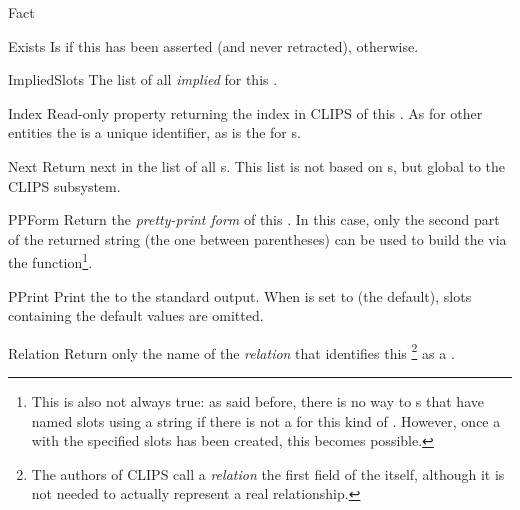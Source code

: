 \begin{classdesc*}{Fact}
\begin{memberdesc}{Exists}{}
Is  if this  has been asserted (and never
retracted),  otherwise.
\end{memberdesc}

\begin{memberdesc}[property]{ImpliedSlots}
The list of all \emph{implied}  for this .
\end{memberdesc}

\begin{memberdesc}[property]{Index}
Read-only property returning the index in CLIPS of this . As
for other entities the  is a unique identifier, as is the
 for s.
\end{memberdesc}

\begin{methoddesc}{Next}{}
Return next  in the list of all s. This list is
not based on s, but global to the CLIPS subsystem.
\end{methoddesc}

\begin{methoddesc}{PPForm}{}
Return the \emph{pretty-print form} of this . In this case,
only the second part of the returned string (the one between parentheses)
can be used to build the  via the 
function\footnote{This is also not always true: as said before, there is
no way to  s that have named slots using a
string if there is not a  for this kind of
. However, once a  with the specified slots
has been created, this becomes possible.}.
\end{methoddesc}

\begin{methoddesc}{PPrint}{}
Print the  to the standard output. When 
is set to  (the default), slots containing the default
values are omitted.
\end{methoddesc}

\begin{memberdesc}[property]{Relation}
Return only the name of the \emph{relation} that identifies this
\footnote{The authors of CLIPS call a \emph{relation} the first
field of the  itself, although it is not needed to actually
represent a real relationship.} as a .
\end{memberdesc}


\end{classdesc*}
